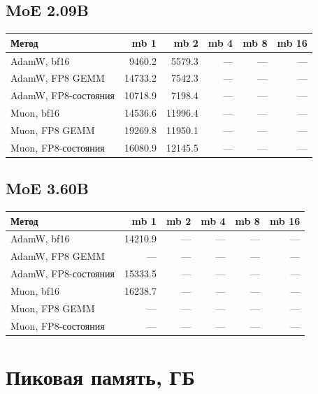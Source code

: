 \documentclass[10pt]{article}
\begin{document}
\subsection{MoE 2.09B}
\begin{center}
\small
\begin{tabular}{lrrrrr}
\toprule
\textbf{Метод} & \textbf{mb 1} & \textbf{mb 2} & \textbf{mb 4} & \textbf{mb 8} & \textbf{mb 16} \\
\midrule
AdamW, bf16 & 9460.2 & 5579.3 & --- & --- & --- \\
AdamW, FP8 GEMM & 14733.2 & 7542.3 & --- & --- & --- \\
AdamW, FP8-состояния & 10718.9 & 7198.4 & --- & --- & --- \\
Muon, bf16 & 14536.6 & 11996.4 & --- & --- & --- \\
Muon, FP8 GEMM & 19269.8 & 11950.1 & --- & --- & --- \\
Muon, FP8-состояния & 16080.9 & 12145.5 & --- & --- & --- \\
\bottomrule
\end{tabular}
\end{center}
\subsection{MoE 3.60B}
\begin{center}
\small
\begin{tabular}{lrrrrr}
\toprule
\textbf{Метод} & \textbf{mb 1} & \textbf{mb 2} & \textbf{mb 4} & \textbf{mb 8} & \textbf{mb 16} \\
\midrule
AdamW, bf16 & 14210.9 & --- & --- & --- & --- \\
AdamW, FP8 GEMM & --- & --- & --- & --- & --- \\
AdamW, FP8-состояния & 15333.5 & --- & --- & --- & --- \\
Muon, bf16 & 16238.7 & --- & --- & --- & --- \\
Muon, FP8 GEMM & --- & --- & --- & --- & --- \\
Muon, FP8-состояния & --- & --- & --- & --- & --- \\
\bottomrule
\end{tabular}
\end{center}
\section{Пиковая память, ГБ}
\end{document}
